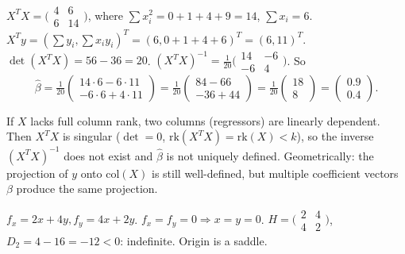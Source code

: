 \begin{solutions}
  \item $X^{T} X = \bigl(\begin{smallmatrix} 4 & 6 \\ 6 & 14 \end{smallmatrix}\bigr)$,
        where $\sum x_{i}^{2} = 0 + 1 + 4 + 9 = 14$, $\sum x_{i} = 6$.
        $X^{T} y = (\sum y_{i}, \sum x_{i} y_{i})^{T} = (6, 0 + 1 + 4 + 6)^{T} = (6, 11)^{T}$.
        $\det(X^{T} X) = 56 - 36 = 20$.
        $(X^{T} X)^{-1} = \tfrac{1}{20}\bigl(\begin{smallmatrix} 14 & -6 \\ -6 & 4 \end{smallmatrix}\bigr)$.
        So
        \[
        \hat{\beta} = \tfrac{1}{20}\begin{pmatrix} 14 \cdot 6 - 6 \cdot 11 \\ -6 \cdot 6 + 4 \cdot 11 \end{pmatrix} = \tfrac{1}{20}\begin{pmatrix} 84 - 66 \\ -36 + 44 \end{pmatrix} = \tfrac{1}{20}\begin{pmatrix} 18 \\ 8 \end{pmatrix} = \begin{pmatrix} 0.9 \\ 0.4 \end{pmatrix}.
        \]

  \item If $X$ lacks full column rank, two columns (regressors) are linearly
        dependent. Then $X^{T} X$ is singular ($\det = 0$,
        $\mathrm{rk}(X^{T} X) = \mathrm{rk}(X) < k$), so the inverse
        $(X^{T} X)^{-1}$ does not exist and $\hat{\beta}$ is not uniquely
        defined. Geometrically: the projection of $y$ onto
        $\mathrm{col}(X)$ is still well-defined, but multiple coefficient
        vectors $\beta$ produce the same projection.

  \item $f_{x} = 2 x + 4 y, f_{y} = 4 x + 2 y$.
        $f_{x} = f_{y} = 0 \Rightarrow x = y = 0$.
        $H = \bigl(\begin{smallmatrix} 2 & 4 \\ 4 & 2 \end{smallmatrix}\bigr)$,
        $D_{2} = 4 - 16 = -12 < 0$: indefinite. Origin is a saddle.


\end{solutions}
